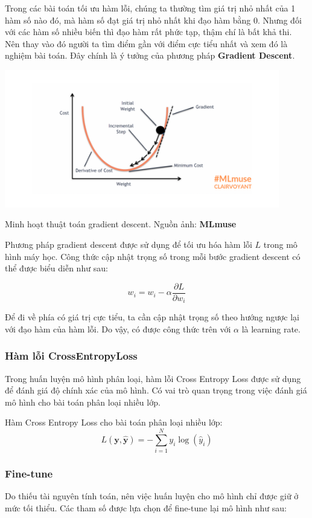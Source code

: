 \documentclass[a4paper, 10pt]{article}
\begin{document}
Trong các bài toán tối ưu hàm lỗi, chúng ta thường tìm giá trị nhỏ nhất của 1 hàm số nào đó, 
mà hàm số đạt giá trị nhỏ nhất khi đạo hàm bằng 0. 
Nhưng đối với các hàm số nhiều biến thì đạo hàm rất phức tạp, 
thậm chí là bất khả thi. 
Nên thay vào đó người ta tìm điểm gần với điểm cực tiểu nhất và xem đó là nghiệm bài toán.
Đây chính là ý tưởng của phương pháp \textbf{Gradient Descent}.

\begin{minipage}{\linewidth}
    \captionsetup{type=figure}
    \centering
    \includegraphics[width=12cm]{./gradient_descent.png}
    \caption{Minh hoạt thuật toán gradient descent. Nguồn ảnh: \textbf{MLmuse}}
\end{minipage}

Phương pháp gradient descent được sử dụng để tối ưu hóa hàm lỗi \( L \) trong mô hình máy học. 
Công thức cập nhật trọng số trong mỗi bước gradient descent có thể được biểu diễn như sau:

\[
w_i = w_i - \alpha \frac{\partial L}{\partial w_i}
\]

Để đi về phía có giá trị cực tiểu, ta cần cập nhật trọng số theo hướng ngược lại với đạo hàm của hàm lỗi. 
Do vậy, có được công thức trên với \(\alpha\) là learning rate.

\subsubsection{Hàm lỗi CrossEntropyLoss}

Trong huấn luyện mô hình phân loại, hàm lỗi Cross Entropy Loss được sử dụng để đánh giá độ chính xác của mô hình.
Có vai trò quan trọng trong việc đánh giá mô hình cho bài toán phân loại nhiều lớp.

Hàm Cross Entropy Loss cho bài toán phân loại nhiều lớp:
\[
L(\mathbf{y}, \mathbf{\hat{y}}) = -\sum_{i=1}^{N} y_i \log(\hat{y}_i)
\]

\subsubsection{Fine-tune}
Do thiếu tài nguyên tính toán, nên việc huấn luyện cho mô hình chỉ được giữ ở mức tối thiểu. Các tham
số được lựa chọn để fine-tune lại mô hình như sau:
\end{document}

